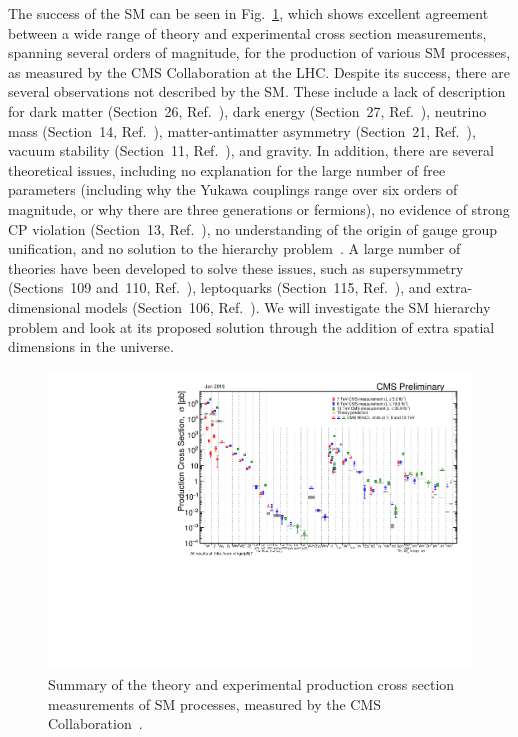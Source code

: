 The success of the SM can be seen in Fig.~\ref{fig:cms_sm_xsec}, which shows excellent agreement between a wide range of theory and experimental cross section measurements, spanning several orders of magnitude, for the production of various SM processes, as measured by the CMS Collaboration at the LHC. Despite its success, there are several observations not described by the SM. These include a lack of description for dark matter (Section~26, Ref.~\cite{Tanabashi:2018oca}), dark energy (Section~27, Ref.~\cite{Tanabashi:2018oca}), neutrino mass (Section~14, Ref.~\cite{Tanabashi:2018oca}), matter-antimatter asymmetry (Section~21, Ref.~\cite{Tanabashi:2018oca}), vacuum stability (Section~11, Ref.~\cite{Tanabashi:2018oca}), and gravity. In addition, there are several theoretical issues, including no explanation for the large number of free parameters (including why the Yukawa couplings range over six orders of magnitude, or why there are three generations or fermions), no evidence of strong CP violation (Section~13, Ref.~\cite{Tanabashi:2018oca}), no understanding of the origin of gauge group unification, and no solution to the hierarchy problem~\cite{hp1,hp2}. A large number of theories have been developed to solve these issues, such as supersymmetry (Sections~109 and~110, Ref.~\cite{Tanabashi:2018oca}), leptoquarks (Section~115, Ref.~\cite{Tanabashi:2018oca}), and extra-dimensional models (Section~106, Ref.~\cite{Tanabashi:2018oca}). We will investigate the SM hierarchy problem and look at its proposed solution through the addition of extra spatial dimensions in the universe.

\begin{figure}[!htb]
  \centering
  \includegraphics[width=1.0\textwidth]{figures/cms_sm_xsec}
  \caption{Summary of the theory and experimental production cross section measurements of SM processes, measured by the CMS Collaboration~\cite{CMS_xsec}.}
  \label{fig:cms_sm_xsec}
\end{figure}



